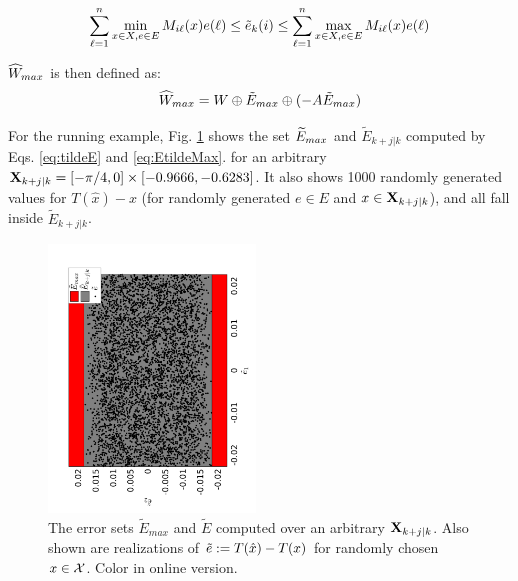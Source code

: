 \begin{equation}
\label{eq:EtildeMax}
\sum_{\ell=1}^{n} \min_{x \in X, e \in E} M_{i\ell}(x)e(\ell)  \leq \tilde{e}_{k}(i)  \leq \sum_{\ell=1}^{n} \max_{x \in X, e \in E} M_{i\ell}(x)e(\ell)
\end{equation}

$\widehat{W}_{max}$ is then defined as:
\begin{equation}
\widehat{W}_{max} = W \oplus \tilde{E}_{max} \oplus (-A\tilde{E}_{max})
\end{equation}

For the running example, Fig. \ref{fig:err_bound_toy} shows the set $\widetilde{E}_{max}$ and $\tilde{E}_{k+j|k}$ computed by Eqs. \eqref{eq:tildeE} and \eqref{eq:EtildeMax}. for an arbitrary  $\mathbf{X}_{k+j|k} =  [-\pi/4,0]\times[-0.9666,-0.6283]$. It also shows 1000 randomly generated values for $T(\hat{x})-x$ (for randomly generated $e \in E$ and $x \in \mathbf{X}_{k+j|k}$), and all fall inside $\tilde{E}_{k+j|k}$.


\begin{figure}
	\includegraphics[angle=270,width=0.49\textwidth]{figs/Err_Bounds_toy.pdf}
	\caption{The error sets $\tilde{E}_{max}$ and $\tilde{E}$ computed over an arbitrary $\mathbf{X}_{k+j|k}$. Also shown are realizations of $\tilde{e} := T(\hat{x}) - T(x)$ for randomly chosen $x \in \mathcal{X}$. Color in online version.}
	\label{fig:err_bound_toy}
\end{figure}



